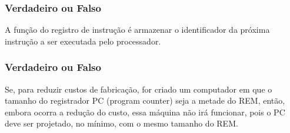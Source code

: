 \documentclass[aspectratio=169,
				xcolor=table]{beamer}
\begin{document}
	\begin{frame}
		\frametitle{Verdadeiro ou Falso}
		A função do registro de instrução é armazenar o identificador da próxima instrução a ser executada pelo processador.
	\end{frame}
	
	\begin{frame}
		\frametitle{Verdadeiro ou Falso}
		Se, para reduzir custos de fabricação, for criado um computador em que o tamanho do registrador PC (program counter) seja a metade do REM, então, embora ocorra a redução do custo, essa máquina não irá funcionar, pois o PC deve ser projetado, no mínimo, com o mesmo tamanho do REM.
	\end{frame}
	
\end{document}
